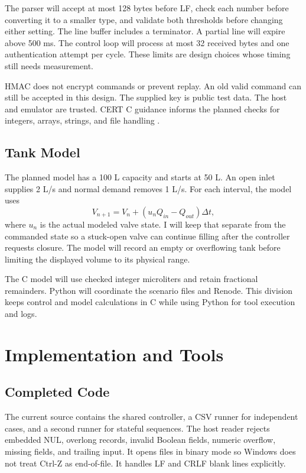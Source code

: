 \documentclass[conference]{IEEEtran}
\begin{document}
The parser will accept at most 128 bytes before LF, check each number before converting it to a smaller type, and validate both thresholds before changing either setting. The line buffer includes a terminator. A partial line will expire above 500 ms. The control loop will process at most 32 received bytes and one authentication attempt per cycle. These limits are design choices whose timing still needs measurement.

HMAC does not encrypt commands or prevent replay. An old valid command can still be accepted in this design. The supplied key is public test data. The host and emulator are trusted. CERT C guidance informs the planned checks for integers, arrays, strings, and file handling \cite{cert}.

\subsection{Tank Model}
The planned model has a 100 L capacity and starts at 50 L. An open inlet supplies 2 L/s and normal demand removes 1 L/s. For each interval, the model uses
\begin{equation}
V_{n+1}=V_n+(u_n Q_{in}-Q_{out})\Delta t,
\end{equation}
where $u_n$ is the actual modeled valve state. I will keep that separate from the commanded state so a stuck-open valve can continue filling after the controller requests closure. The model will record an empty or overflowing tank before limiting the displayed volume to its physical range.

The C model will use checked integer microliters and retain fractional remainders. Python will coordinate the scenario files and Renode. This division keeps control and model calculations in C while using Python for tool execution and logs.

\section{Implementation and Tools}
\subsection{Completed Code}
The current source contains the shared controller, a CSV runner for independent cases, and a second runner for stateful sequences. The host reader rejects embedded NUL, overlong records, invalid Boolean fields, numeric overflow, missing fields, and trailing input. It opens files in binary mode so Windows does not treat Ctrl-Z as end-of-file. It handles LF and CRLF blank lines explicitly.
\end{document}
